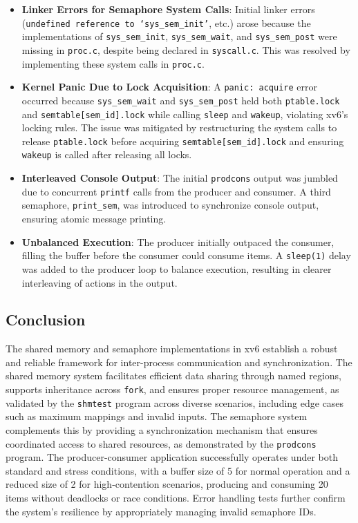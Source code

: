 \documentclass[12pt]{article}
\begin{document}
\begin{itemize}
  \item \textbf{Linker Errors for Semaphore System Calls}: Initial linker errors (\texttt{undefined reference to `sys\_sem\_init'}, etc.) arose because the implementations of \texttt{sys\_sem\_init}, \texttt{sys\_sem\_wait}, and \texttt{sys\_sem\_post} were missing in \texttt{proc.c}, despite being declared in \texttt{syscall.c}. This was resolved by implementing these system calls in \texttt{proc.c}.
  \item \textbf{Kernel Panic Due to Lock Acquisition}: A \texttt{panic: acquire} error occurred because \texttt{sys\_sem\_wait} and \texttt{sys\_sem\_post} held both \texttt{ptable.lock} and \texttt{semtable[sem\_id].lock} while calling \texttt{sleep} and \texttt{wakeup}, violating xv6’s locking rules. The issue was mitigated by restructuring the system calls to release \texttt{ptable.lock} before acquiring \texttt{semtable[sem\_id].lock} and ensuring \texttt{wakeup} is called after releasing all locks.
  \item \textbf{Interleaved Console Output}: The initial \texttt{prodcons} output was jumbled due to concurrent \texttt{printf} calls from the producer and consumer. A third semaphore, \texttt{print\_sem}, was introduced to synchronize console output, ensuring atomic message printing.
  \item \textbf{Unbalanced Execution}: The producer initially outpaced the consumer, filling the buffer before the consumer could consume items. A \texttt{sleep(1)} delay was added to the producer loop to balance execution, resulting in clearer interleaving of actions in the output.
\end{itemize}

\subsection{Conclusion}
\label{subsec:conclusion}

The shared memory and semaphore implementations in xv6 establish a robust and reliable framework for inter-process communication and synchronization. The shared memory system facilitates efficient data sharing through named regions, supports inheritance across \texttt{fork}, and ensures proper resource management, as validated by the \texttt{shmtest} program across diverse scenarios, including edge cases such as maximum mappings and invalid inputs. The semaphore system complements this by providing a synchronization mechanism that ensures coordinated access to shared resources, as demonstrated by the \texttt{prodcons} program. The producer-consumer application successfully operates under both standard and stress conditions, with a buffer size of 5 for normal operation and a reduced size of 2 for high-contention scenarios, producing and consuming 20 items without deadlocks or race conditions. Error handling tests further confirm the system’s resilience by appropriately managing invalid semaphore IDs.
\end{document}
